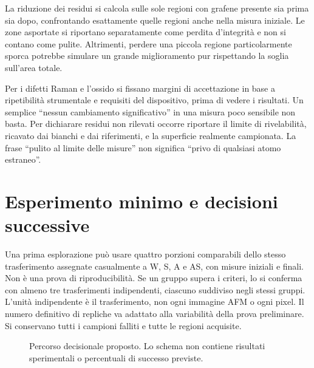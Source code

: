\documentclass[11pt,reqno]{amsart}
\numberwithin{equation}{section}
\begin{document}
La riduzione dei residui si calcola sulle sole regioni con grafene
presente sia prima sia dopo, confrontando esattamente quelle regioni
anche nella misura iniziale. Le zone asportate si riportano separatamente
come perdita d'integrit\`a e non si contano come pulite. Altrimenti,
perdere una piccola regione particolarmente sporca potrebbe simulare
un grande miglioramento pur rispettando la soglia sull'area totale.

Per i difetti Raman e l'ossido si fissano margini di accettazione
in base a ripetibilit\`a strumentale e requisiti del dispositivo, prima
di vedere i risultati. Un semplice ``nessun cambiamento significativo''
in una misura poco sensibile non basta. Per dichiarare residui non
rilevati occorre riportare il limite di rivelabilit\`a, ricavato dai
bianchi e dai riferimenti, e la superficie realmente campionata.
La frase ``pulito al limite delle misure'' non significa ``privo di
qualsiasi atomo estraneo''.

\section{Esperimento minimo e decisioni successive}

Una prima esplorazione pu\`o usare quattro porzioni comparabili dello
stesso trasferimento assegnate casualmente a W, S, A e AS, con misure
iniziali e finali. Non \`e una prova di riproducibilit\`a. Se un gruppo
supera i criteri, lo si conferma con almeno tre trasferimenti
indipendenti, ciascuno suddiviso negli stessi gruppi. L'unit\`a
indipendente \`e il trasferimento, non ogni immagine AFM o ogni pixel.
Il numero definitivo di repliche va adattato alla variabilit\`a della
prova preliminare. Si conservano tutti i campioni falliti e tutte
le regioni acquisite.

\begin{figure}[htbp]
\centering
{}
\caption{Percorso decisionale proposto. Lo schema non contiene
risultati sperimentali o percentuali di successo previste.}
\end{figure}
\FloatBarrier
\end{document}
